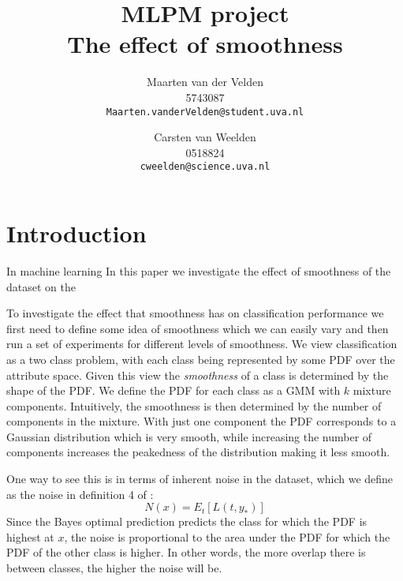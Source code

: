\documentclass[a4paper]{article}
\begin{document}
\title{MLPM project \\ The effect of smoothness}
\author{Maarten van der Velden \\ 5743087 \\ \texttt{Maarten.vanderVelden@student.uva.nl} \and Carsten van Weelden \\ 0518824 \\ \texttt{cweelden@science.uva.nl}}
\maketitle


\acresetall

\section{Introduction}
\label{sec:introduction}

In machine learning 
In this paper we investigate the effect of smoothness of the dataset on the 


To investigate the effect that smoothness has on classification performance we first need to define some idea of smoothness which we can easily vary and then run a set of experiments for different levels of smoothness. We view classification as a two class problem, with each class being represented by some \ac{PDF} over the attribute space. Given this view the \emph{smoothness} of a class is determined by the shape of the \ac{PDF}. We define the \ac{PDF} for each class as a \ac{GMM} with $k$ mixture components. Intuitively, the smoothness is then determined by the number of components in the mixture. With just one component the \ac{PDF} corresponds to a Gaussian distribution which is very smooth, while increasing the number of components increases the peakedness of the distribution making it less smooth.

One way to see this is in terms of inherent noise in the dataset, which we define as the noise in definition 4 of \cite{Domingos2000}:
\begin{equation}
\label{eq:noise}
N(x) = E_t[L(t,y_*)]
\end{equation}
Since the Bayes optimal prediction predicts the class for which the \ac{PDF} is highest at $x$, the noise is proportional to the area under the \ac{PDF} for which the \ac{PDF} of the other class is higher. In other words, the more overlap there is between classes, the higher the noise will be.
\end{document}
